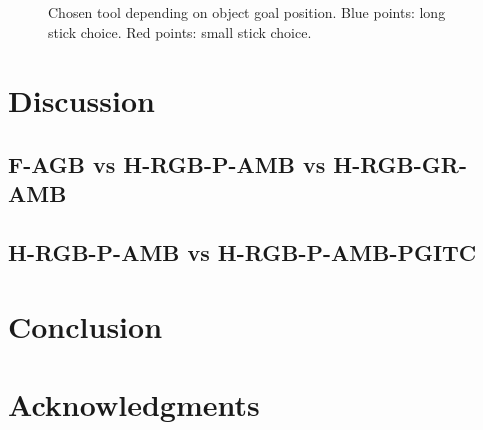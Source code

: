 \documentclass[10pt,letterpaper]{article}
\begin{document}
	\begin{figure}[ht]
		\caption{Chosen tool depending on object goal position. Blue points: long stick choice. Red points: small stick choice.}
		\label{res_choice}
	\end{figure}
	
%


\section{Discussion}

	\subsection{F-AGB vs H-RGB-P-AMB vs H-RGB-GR-AMB}
	
	
	
	\subsection{H-RGB-P-AMB vs H-RGB-P-AMB-PGITC}
	
	
	
%


\section{Conclusion}

%


\section{Acknowledgments}

%






\setlength{\bibleftmargin}{.125in}
\setlength{\bibindent}{-\bibleftmargin}


\end{document}
